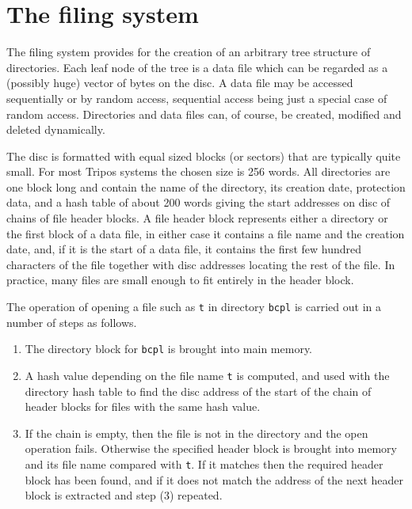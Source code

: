 \section{The filing system}

     The filing system provides for the creation of an arbitrary tree
structure of directories.  Each leaf node of the tree is a data file
which can be regarded as a (possibly huge) vector of bytes on the
disc.  A data file may be accessed sequentially or by random access,
sequential access being just a special case of random access.
Directories and data files can, of course, be created, modified and
deleted dynamically.

     The disc is formatted with equal sized blocks (or sectors) that
are typically quite small.  For most Tripos systems the chosen size is
256 words.  All directories are one block long and contain the name of
the directory, its creation date, protection data, and a hash table of
about 200 words giving the start addresses on disc of chains of file
header blocks.  A file header block represents either a directory or
the first block of a data file, in either case it contains a file name
and the creation date, and, if it is the start of a data file, it
contains the first few hundred characters of the file together with
disc addresses locating the rest of the file.  In practice, many files
are small enough to fit entirely in the header block.

     The operation of opening a file such as \verb|t| in directory
\verb|bcpl| is carried out in a number of steps as follows.

\begin{enumerate}
\item The directory block for \verb|bcpl| is brought into main memory.

\item A hash value depending on the file name \verb|t| is 
computed, and used with the directory hash table to find the disc
address of the start of the chain of header blocks for files with the
same hash value.

\item If the chain is empty, then the file is not in the 
directory and the open operation fails.  Otherwise the specified
header block is brought into memory and its file name compared with
\verb|t|.  If it matches then the required header block has been found, and
if it does not match the address of the next header block is extracted
and step (3) repeated.
\end{enumerate}

